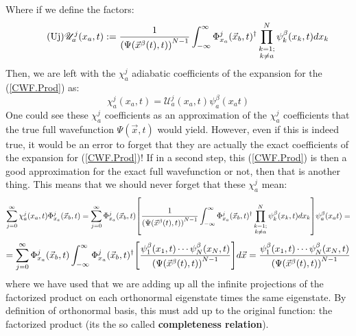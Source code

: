 \documentclass[11pt, a4paper]{article} %
\newcommand{\U}{\mathscr{U}}
\begin{document}
Where if we define the factors:
\begin{equation}\label{Uj}\tag{Uj}
\U^j_a(x_a,t):=\frac{1}{ \qty(\Psi(\vec{x}^\beta(t),t))^{N-1}} \int_{-\infty}^\infty \Phi_{x_a}^j(\vec{x}_b,t)^\dagger \prod_{\substack{k=1; \\ k\neq a}}^{N}\psi^\beta_k(x_k,t) dx_k \vspace{-0.3cm}
\end{equation}
Then, we are left with the $\chi^j_a$ adiabatic coefficients of the expansion for the (\ref{CWF.Prod}) as:
$$
\chi_a^j(x_a,t)= \U^j_a(x_a,t)\psi_a^\beta(x_a t)
$$
One could see these $\chi^j_a$ coefficients as an approximation of the $\chi_a^j$ coefficients that the true full wavefunction $\Psi(\vec{x},t)$ would yield. However, even if this is indeed true, it would be an error to forget that they are actually the exact coefficients of the expansion for (\ref{CWF.Prod})! If in a second step, this (\ref{CWF.Prod}) is then a good approximation for the exact full wavefunction or not, then that is another thing. This means that we should never forget that these $\chi_a^j$ mean:
$$
\sum_{j=0}^\infty \chi^j_a(x_a,t) \Phi_{x_a}^j(\vec{x}_b,t) = \sum_{j=0}^\infty \Phi_{x_a}^j(\vec{x}_b,t) \qty[\frac{1}{ \qty(\Psi(\vec{x}^\beta(t),t))^{N-1}}\int_{-\infty}^\infty \Phi_{x_a}^j(\vec{x}_b,t)^\dagger \prod_{\substack{k=1; \\ k\neq a}}^{N} \psi^\beta_k(x_k,t) dx_k ] \psi_a^\beta(x_a t)=
$$
$$
=\sum_{j=0}^\infty \Phi_{x_a}^j(\vec{x}_b,t)\int_{-\infty}^\infty \Phi_{x_a}^j(\vec{x}_b,t)^\dagger \qty[ \frac{\psi^\beta_1(x_1,t)\cdots \psi^\beta_N(x_N,t) }{\qty(\Psi(\vec{x}^\beta(t),t))^{N-1}} ]d\vec{x}=\frac{\psi^\beta_1(x_1,t)\cdots \psi^\beta_N(x_N,t) }{\qty(\Psi(\vec{x}^\beta(t),t))^{N-1}}
$$
where we have used that we are adding up all the infinite projections of the factorized product on each orthonormal eigenstate times the same eigenstate. By definition of orthonormal basis, this must add up to the original function: the factorized product (its the so called {\bf completeness relation}).
\end{document}
